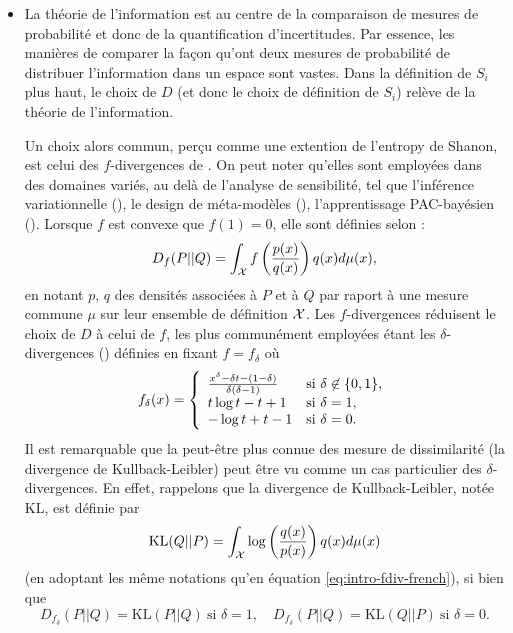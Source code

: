 \begin{itemize}
    \item La théorie de l'information est au centre de la comparaison de mesures de probabilité et donc de la quantification d'incertitudes. Par essence, les manières de comparer la façon qu'ont deux mesures de probabilité de  distribuer l'information dans un espace sont vastes. 
    Dans la définition de $S_i$ plus haut, le choix de $D$ (et donc le choix de définition de $S_i$) relève de la théorie de l'information.
    
    
    Un choix alors commun, perçu comme une extention de l'entropy de Shanon, est celui des $f$-divergences de \citet{csiszar_information-type_1967}. On peut noter qu'elles sont employées dans des domaines variés, au delà de l'analyse de sensibilité, tel que l'inférence variationnelle (\cite{minka_divergence_2005,bach_sum--squares_2023}), le design de méta-modèles (\cite{nguyen_surrogate_2009}), l'apprentissage PAC-bayésien (\cite{picard-weibel_change_2022}).
    Lorsque $f$ est convexe que $f(1)=0$, elle sont définies selon :
        \begin{equation}\label{eq:intro-fdiv-french}
            D_f(P||Q) = \int_{\mathcal{X}} f\left( \frac{p(x)}{q(x)} \right) q(x)d\mu(x),
        \end{equation}
    en notant $p$, $q$ des densités associées à $P$ et à $Q$ par raport à une mesure commune $\mu$ sur leur ensemble de définition $\mathcal{X}$.     
    Les $f$-divergences réduisent le choix de $D$ à celui de $f$, les plus communément employées étant les $\delta$-divergences (\cite{zhu_information_1995}) définies en fixant $f=f_\delta$ où
        \begin{equation}
            f_\delta(x) = \left\lbrace\begin{array}{l l} \frac{x^\delta-\delta t-(1-\delta)}{\delta(\delta-1)} & \text{si\ }\delta\not\in\{0,1\},\\ 
                t\log t-t+1  & \text{si\ }\delta=1, \\
                -\log t +t -1 & \text{si\ }\delta=0.
            \end{array}\right. 
        \end{equation}    
    Il est remarquable que la peut-être plus connue des mesure de dissimilarité (la divergence de Kullback-Leibler) peut être vu comme un cas particulier des $\delta$-divergences. En effet, rappelons que la divergence de Kullback-Leibler, notée $\text{KL}$, est définie par 
        \begin{equation}
            \text{KL}(Q||P) = \int_{\mathcal{X}}\log\left(\frac{q(x)}{p(x)}\right)q(x)d\mu(x)
        \end{equation}
        (en adoptant les même notations qu'en équation \eqref{eq:intro-fdiv-french}), si bien que 
        \begin{equation}
            D_{f_\delta}(P||Q) = \text{KL}(P||Q)\ \text{si\ }\delta=1,\quad D_{f_\delta}(P||Q) = \text{KL}(Q||P)\ \text{si\ }\delta=0.
        \end{equation}


\end{itemize}
